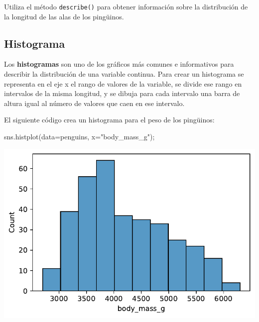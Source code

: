 \documentclass[
  a4paper,
  noprof,
  12pt,
  notoc,
  nosols,
  nobib]{mnye}
\newenvironment{Shaded}{\begin{snugshade}}{\end{snugshade}}
\newcommand{\NormalTok}[1]{\textcolor[rgb]{0.00,0.23,0.31}{#1}}
\newcommand{\OperatorTok}[1]{\textcolor[rgb]{0.37,0.37,0.37}{#1}}
\newcommand{\StringTok}[1]{\textcolor[rgb]{0.13,0.47,0.30}{#1}}
\renewenvironment{exercise}[1][]{
            \if\relax\detokenize{#1}\relax
                \ex
            \else
                \ex[note={#1}]
            \fi
        }{\endex}
\theoremstyle{definition}
\newtheorem{exercise}{Ejercicio}[section]
\theoremstyle{remark}
\begin{document}
\begin{exercise}[]%
\protect\hypertarget{exr-1numerical-describe}{}\label{exr-1numerical-describe}%
Utiliza el método \texttt{describe()} para obtener información sobre la
distribución de la longitud de las alas de los pingüinos.

\end{exercise}

\subsection{Histograma}\label{sec-1numerical-histogram}

Los \textbf{histogramas} son uno de los gráficos más comunes e
informativos para describir la distribución de una variable continua.
Para crear un histograma se representa en el eje x el rango de valores
de la variable, se divide ese rango en intervalos de la misma longitud,
y se dibuja para cada intervalo una barra de altura igual al número de
valores que caen en ese intervalo.

El siguiente código crea un histograma para el peso de los pingüinos:

\begin{Shaded}
\begin{Highlighting}[]
\NormalTok{sns.histplot(data}\OperatorTok{=}\NormalTok{penguins, x}\OperatorTok{=}\StringTok{"body\_mass\_g"}\NormalTok{)}\OperatorTok{;}
\end{Highlighting}
\end{Shaded}

\includegraphics{chapters/1numerical_files/figure-pdf/cell-5-output-1.pdf}
\end{document}
